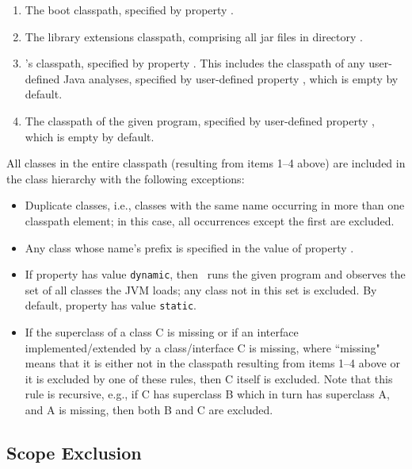 \begin{enumerate}
\item
The boot classpath, specified by property .
\item
The library extensions classpath, comprising all jar files in
directory .
\item
\Chord's classpath, specified by property
.  This includes the classpath of any
user-defined Java analyses, specified by user-defined property
, which is empty by default.
\item
The classpath of the given program, specified by user-defined property
, which is empty by default.
\end{enumerate}

All classes in the entire classpath (resulting from items 1--4 above)
are included in the class hierarchy with the following exceptions:
\begin{itemize}
\item
Duplicate classes, i.e., classes with the same name occurring in more
than one classpath element; in this case, all occurrences except the
first are excluded.
\item
Any class whose name's prefix is specified in the value of property
.
\item
If property  has value {\tt dynamic}, then
\Chord\ runs the given program and observes the set of all classes the
JVM loads; any class not in this set is excluded.  By default,
property  has value {\tt static}.
\item
If the superclass of a class C is missing or if an interface
implemented/extended by a class/interface C is missing, where
``missing" means that it is either not in the classpath resulting from
items 1--4 above or it is excluded by one of these rules, then C
itself is excluded.  Note that this rule is recursive, e.g., if C has
superclass B which in turn has superclass A, and A is missing, then
both B and C are excluded.
\end{itemize}

\subsection{Scope Exclusion}


